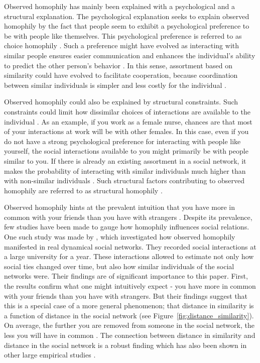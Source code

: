 \documentclass[11pt]{article}
\begin{document}
\noindent Observed homophily has mainly been explained with a psychological and a structural explanation. The psychological explanation seeks to explain observed homophily by the fact that people seem to exhibit a psychological preference to be with people like themselves. This psychological preference is referred to as choice homophily \cite{asikainen_cumulative_2020,mcpherson_birds_2001,winter_you_2020}.
Such a preference might have evolved as interacting with similar people ensures easier communication and enhances the individual's ability to predict the other person's behavior \cite{kossinets_origins_2009,winter_you_2020}. In this sense, assortment based on similarity could have evolved to facilitate cooperation, because coordination between similar individuals is simpler and less costly for the individual \cite{winter_you_2020,carter2015phenotypic, smaldino2019social}. 

Observed homophily could also be explained by structural constraints. Such constraints could limit how dissimilar choices of interactions are available to the individual \cite{peixoto_disentangling_2022}. As an example, if you work as a female nurse, chances are that most of your interactions at work will be with other females. 
In this case, even if you do not have a strong psychological preference for interacting with people like yourself, the social interactions available to you might primarily be with people similar to you. 
If there is already an existing assortment in a social network, it makes the probability of interacting with similar individuals much higher than with non-similar individuals \cite{peixoto_disentangling_2022}. Such structural factors contributing to observed homophily are referred to as structural homophily \cite{asikainen_cumulative_2020,mcpherson_birds_2001,winter_you_2020}. 

\noindent Observed homophily hints at the prevalent intuition that you have more in common with your friends than you have with strangers \cite{mcpherson_birds_2001}.
Despite its prevalence, few studies have been made to gauge how homophily influences social relations. One such study was made by , which investigated how observed homophily manifested in real dynamical social networks. They recorded social interactions at a large university for a year. These interactions allowed  to estimate not only how social ties changed over time, but also how similar individuals of the social networks were. Their findings are of significant importance to this paper. First, the results confirm what one might intuitively expect - you have more in common with your friends than you have with strangers. But their findings suggest that this is a special case of a more general phenomenon; that distance in similarity is a function of distance in the social network (see Figure~\ref{fig:distance_similarity}). On average, the further you are removed from someone in the social network, the less you will have in common \cite{kossinets_origins_2009}. 
The connection between distance in similarity and distance in the social network is a robust finding which has also been shown in other large empirical studies \cite{bener_empirical_2016,crandall_feedback_2008}.
\end{document}
